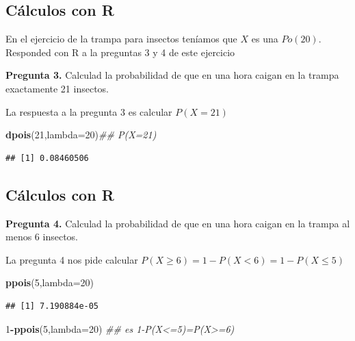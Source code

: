 \documentclass[]{book}
\newenvironment{Shaded}{\begin{snugshade}}{\end{snugshade}}
\newcommand{\CommentTok}[1]{\textcolor[rgb]{0.56,0.35,0.01}{\textit{#1}}}
\newcommand{\DataTypeTok}[1]{\textcolor[rgb]{0.13,0.29,0.53}{#1}}
\newcommand{\DecValTok}[1]{\textcolor[rgb]{0.00,0.00,0.81}{#1}}
\newcommand{\KeywordTok}[1]{\textcolor[rgb]{0.13,0.29,0.53}{\textbf{#1}}}
\newcommand{\NormalTok}[1]{#1}
\newcommand{\OperatorTok}[1]{\textcolor[rgb]{0.81,0.36,0.00}{\textbf{#1}}}
\begin{document}
\hypertarget{cuxe1lculos-con-r-7}{%
\subsection{Cálculos con R}\label{cuxe1lculos-con-r-7}}

En el ejercicio de la trampa para insectos teníamos que \(X\) es una \(Po(20)\). Responded con R a la preguntas 3 y 4 de este ejercicio

\textbf{Pregunta 3.} Calculad la probabilidad de que en una hora caigan en la trampa exactamente 21 insectos.

La respuesta a la pregunta 3 es calcular \(P(X=21)\)

\begin{Shaded}
\begin{Highlighting}[]
\KeywordTok{dpois}\NormalTok{(}\DecValTok{21}\NormalTok{,}\DataTypeTok{lambda=}\DecValTok{20}\NormalTok{)}\CommentTok{## P(X=21)}
\end{Highlighting}
\end{Shaded}

\begin{verbatim}
## [1] 0.08460506
\end{verbatim}

\hypertarget{cuxe1lculos-con-r-8}{%
\subsection{Cálculos con R}\label{cuxe1lculos-con-r-8}}

\textbf{Pregunta 4.} Calculad la probabilidad de que en una hora caigan en la trampa al menos 6 insectos.

La pregunta 4 nos pide calcular \(P(X\geq 6)=1-P(X<6)=1-P(X\leq 5)\)

\begin{Shaded}
\begin{Highlighting}[]
\KeywordTok{ppois}\NormalTok{(}\DecValTok{5}\NormalTok{,}\DataTypeTok{lambda=}\DecValTok{20}\NormalTok{)}
\end{Highlighting}
\end{Shaded}

\begin{verbatim}
## [1] 7.190884e-05
\end{verbatim}

\begin{Shaded}
\begin{Highlighting}[]
\DecValTok{1}\OperatorTok{-}\KeywordTok{ppois}\NormalTok{(}\DecValTok{5}\NormalTok{,}\DataTypeTok{lambda=}\DecValTok{20}\NormalTok{) }\CommentTok{## es 1-P(X<=5)=P(X>=6)}
\end{Highlighting}
\end{Shaded}
\end{document}
